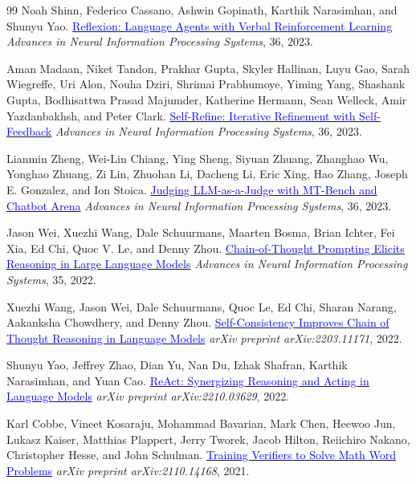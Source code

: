 \documentclass{article}
\begin{document}
\begin{thebibliography}{99}
Noah Shinn, Federico Cassano, Ashwin Gopinath, Karthik Narasimhan, and Shunyu Yao.
\href{https://arxiv.org/abs/2303.11366}{\textcolor{blue}{{Reflexion}: Language Agents with Verbal Reinforcement Learning}}
\textit{Advances in Neural Information Processing Systems}, 36, 2023.

Aman Madaan, Niket Tandon, Prakhar Gupta, Skyler Hallinan, Luyu Gao,
Sarah Wiegreffe, Uri Alon, Nouha Dziri, Shrimai Prabhumoye, Yiming Yang,
Shashank Gupta, Bodhisattwa Prasad Majumder, Katherine Hermann,
Sean Welleck, Amir Yazdanbakhsh, and Peter Clark.
\href{https://arxiv.org/abs/2303.17651}{\textcolor{blue}{{Self-Refine}: Iterative Refinement with Self-Feedback}}
\textit{Advances in Neural Information Processing Systems}, 36, 2023.

Lianmin Zheng, Wei-Lin Chiang, Ying Sheng, Siyuan Zhuang, Zhanghao Wu,
Yonghao Zhuang, Zi Lin, Zhuohan Li, Dacheng Li, Eric Xing, Hao Zhang,
Joseph E. Gonzalez, and Ion Stoica.
\href{https://arxiv.org/abs/2306.05685}{\textcolor{blue}{Judging {LLM}-as-a-{Judge} with {MT-Bench} and {Chatbot Arena}}}
\textit{Advances in Neural Information Processing Systems}, 36, 2023.

Jason Wei, Xuezhi Wang, Dale Schuurmans, Maarten Bosma, Brian Ichter,
Fei Xia, Ed Chi, Quoc V. Le, and Denny Zhou.
\href{https://arxiv.org/abs/2201.11903}{\textcolor{blue}{Chain-of-Thought Prompting Elicits Reasoning in Large Language Models}}
\textit{Advances in Neural Information Processing Systems}, 35, 2022.

Xuezhi Wang, Jason Wei, Dale Schuurmans, Quoc Le, Ed Chi, Sharan Narang,
Aakanksha Chowdhery, and Denny Zhou.
\href{https://arxiv.org/abs/2203.11171}{\textcolor{blue}{Self-Consistency Improves Chain of Thought Reasoning in Language Models}}
\textit{arXiv preprint arXiv:2203.11171}, 2022.

Shunyu Yao, Jeffrey Zhao, Dian Yu, Nan Du, Izhak Shafran,
Karthik Narasimhan, and Yuan Cao.
\href{https://arxiv.org/abs/2210.03629}{\textcolor{blue}{{ReAct}: Synergizing Reasoning and Acting in Language Models}}
\textit{arXiv preprint arXiv:2210.03629}, 2022.

Karl Cobbe, Vineet Kosaraju, Mohammad Bavarian, Mark Chen, Heewoo Jun,
Lukasz Kaiser, Matthias Plappert, Jerry Tworek, Jacob Hilton,
Reiichiro Nakano, Christopher Hesse, and John Schulman.
\href{https://arxiv.org/abs/2110.14168}{\textcolor{blue}{Training Verifiers to Solve Math Word Problems}}
\textit{arXiv preprint arXiv:2110.14168}, 2021.


\end{thebibliography}
\end{document}
